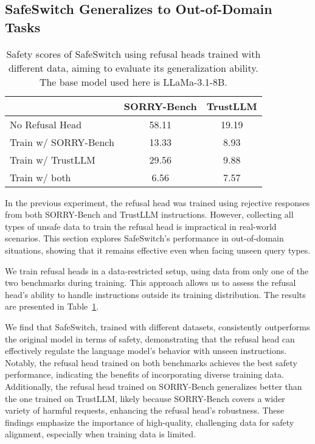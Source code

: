 \subsection{SafeSwitch Generalizes to Out-of-Domain Tasks}
\label{result:ood}

\begin{table}[]
\caption{Safety scores of SafeSwitch using refusal heads trained with different data, aiming to evaluate its generalization ability. The base model used here is LLaMa-3.1-8B.}\label{table:ood}
\vspace{2mm}
\centering
\renewcommand{\arraystretch}{1.1}
\fontsize{8.5pt}{9pt}\selectfont
\begin{tabular}{lcc}
\toprule
& SORRY-Bench & TrustLLM \\
\midrule
No Refusal Head   & 58.11           & 19.19        \\
Train w/ SORRY-Bench            & 13.33           &  8.93     \\
Train w/ TrustLLM               & 29.56           & 9.88       \\
Train w/ both   & 6.56           & 7.57      \\
\bottomrule
\end{tabular}
\end{table}

In the previous experiment, the refusal head was trained using rejective responses from both SORRY-Bench and TrustLLM instructions. However, collecting all types of unsafe data to train the refusal head is impractical in real-world scenarios. This section explores SafeSwitch's performance in out-of-domain situations, showing that it remains effective even when facing unseen query types.

We train refusal heads in a data-restricted setup, using data from only one of the two benchmarks during training. This approach allows us to assess the refusal head’s ability to handle instructions outside its training distribution. The results are presented in Table~\ref{table:ood}.

We find that SafeSwitch, trained with different datasets, consistently outperforms the original model in terms of safety, demonstrating that the refusal head can effectively regulate the language model’s behavior with unseen instructions. Notably, the refusal head trained on both benchmarks achieves the best safety performance, indicating the benefits of incorporating diverse training data. Additionally, the refusal head trained on SORRY-Bench generalizes better than the one trained on TrustLLM, likely because SORRY-Bench covers a wider variety of harmful requests, enhancing the refusal head's robustness. These findings emphasize the importance of high-quality, challenging data for safety alignment, especially when training data is limited.
